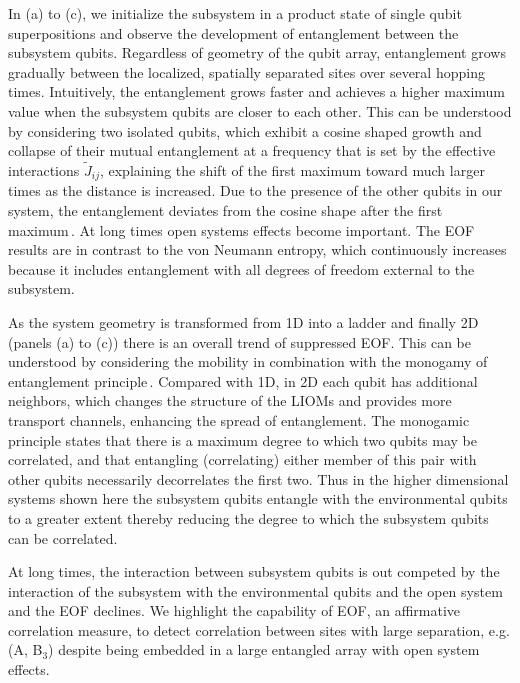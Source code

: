 In (a) to (c), we initialize the subsystem in a product state of single qubit superpositions and observe the development of entanglement between the subsystem qubits. Regardless of geometry of the qubit array, entanglement grows gradually between the localized, spatially separated sites over several hopping times.  Intuitively, the entanglement grows faster and achieves a higher maximum value when the subsystem qubits are closer to each other. This can be understood by considering two isolated qubits, which exhibit a cosine shaped growth and collapse of their mutual entanglement at a frequency that is set by the effective interactions $\widetilde{J}_{ij}$, explaining the shift of the first maximum toward much larger times as the distance is increased. Due to the presence of the other qubits in our system, the entanglement deviates from the cosine shape after the first maximum\,\cite{Serbyn2013b}.  At long times open systems effects become important. The EOF results are in contrast to the von Neumann entropy, which continuously increases because it includes entanglement with all degrees of freedom external to the subsystem.

As the system geometry is transformed from 1D into a ladder and finally 2D (panels (a) to (c)) there is an overall trend of suppressed EOF.  This can be understood by considering the mobility in combination with the monogamy of entanglement principle\,\cite{Wootters2000}. Compared with 1D, in 2D each qubit has additional neighbors, which changes the structure of the LIOMs and provides more transport channels, enhancing the spread of entanglement.  The monogamic principle states that there is a maximum degree to which two qubits may be correlated, and that entangling (correlating) either member of this pair with other qubits necessarily decorrelates the first two.  Thus in the higher dimensional systems shown here the subsystem qubits entangle with the environmental qubits to a greater extent thereby reducing the degree to which the subsystem qubits can be correlated.

At long times, the interaction between subsystem qubits is out competed by the interaction of the subsystem with the environmental qubits and the open system and the EOF declines.  We highlight the capability of EOF, an affirmative correlation measure, to detect correlation between sites with large separation, e.g. (A, B$_3$) despite being embedded in a large entangled array with open system effects.


